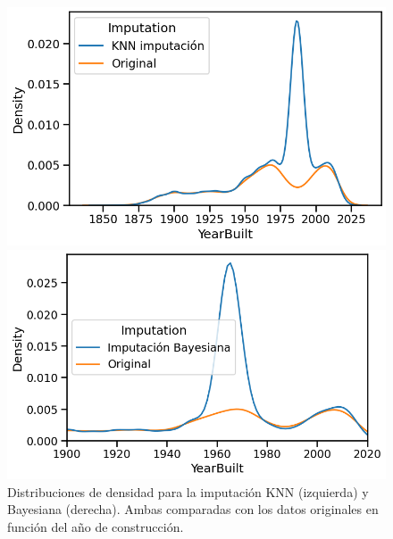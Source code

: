 \begin{figure}[!t]
\begin{minipage}{0.48\textwidth}
  \centering
  \includegraphics[width=\linewidth]{img/imputacion-KNN.png}
\end{minipage}\hfill
\begin{minipage}{0.48\textwidth}
  \centering
  \includegraphics[width=\linewidth]{img/imputacion-bayesiana.png}
\end{minipage}
\caption{Distribuciones de densidad para la imputación KNN (izquierda) y Bayesiana (derecha). Ambas comparadas con los datos originales en función del año de construcción.}
\label{f.imputacion}
\end{figure}



